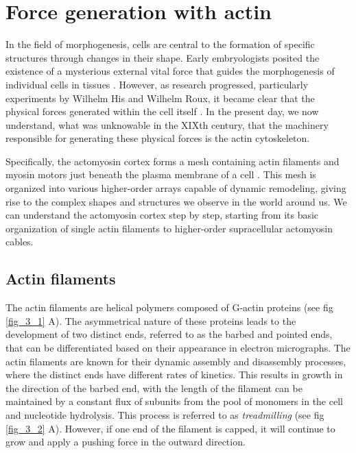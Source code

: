 \hypertarget{force-generation-with-actin}{%
	\section{Force generation with
		actin}\label{force-generation-with-actin}}

In the field of morphogenesis, cells are central to the formation of specific structures through changes in their shape. Early embryologists posited the existence of a mysterious external vital force that guides the morphogenesis of individual cells in tissues \cite{thompson1979}. However, as research progressed, particularly experiments by Wilhelm His and Wilhelm Roux, it became clear that the physical forces generated within the cell itself \cite{clarke2021}. In the present day, we now understand, what was unknowable in the XIXth century, that the machinery responsible for generating these physical forces is the actin cytoskeleton.

Specifically, the actomyosin cortex forms a mesh containing actin filaments and myosin motors just beneath the plasma membrane of a cell \cite{alberts2015}. This mesh is organized into various higher-order arrays capable of dynamic remodeling, giving rise to the complex shapes and structures we observe in the world around us. We can understand the actomyosin cortex step by step, starting from its basic organization of single actin filaments to higher-order supracellular actomyosin cables.

\hypertarget{actin-filaments}{%
	\subsection{Actin filaments}\label{actin-filaments}}

The actin filaments are helical polymers composed of G-actin proteins (see fig \ref{fig_3_1} A).
The asymmetrical nature of these proteins leads to the development of two distinct ends, referred to as the barbed and pointed ends, that can be differentiated based on their appearance in electron micrographs. The actin filaments are known for their dynamic assembly and disassembly processes, where the distinct ends have different rates of kinetics. This results in growth in the direction of the barbed end, with the length of the filament can be maintained by a constant flux of subunits from the pool of monomers in the cell and nucleotide hydrolysis. This process is referred to as \textit{treadmilling} (see fig \ref{fig_3_2} A). However, if one end of the filament is capped, it will continue to grow and apply a pushing force in the outward direction.

